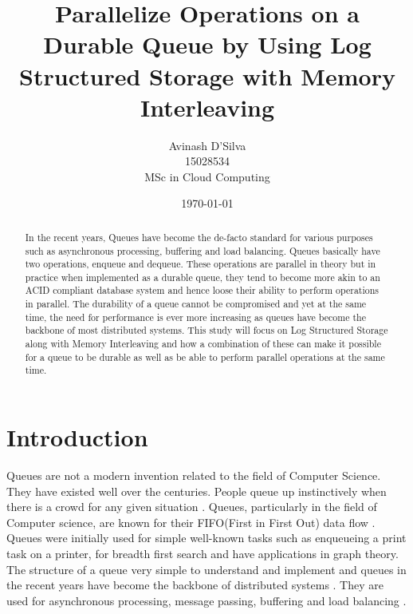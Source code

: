 \documentclass[12pt,a4paper]{article}
\begin{document}
\title{Parallelize Operations on a Durable Queue by Using Log Structured Storage with Memory Interleaving}%
\author{Avinash D'Silva \\ 15028534 \\ MSc in Cloud Computing}%
\date{\today}
\maketitle

\begin{abstract}
 In the recent years, Queues have become the de-facto standard for various purposes such as asynchronous processing, buffering and load balancing. Queues basically have two operations, enqueue and dequeue. These operations are parallel in theory but in practice when implemented as a durable queue, they tend to become more akin to an ACID compliant database system and hence loose their ability to perform operations in parallel. The durability of a queue cannot be compromised and yet at the same time, the need for performance is ever more increasing as queues have become the backbone of most distributed systems. This study will focus on Log Structured Storage along with Memory Interleaving and how a combination of these can make it possible for a queue to be durable as well as be able to perform parallel operations at the same time.
\end{abstract}

\tableofcontents

\section{Introduction}

Queues are not a modern invention related to the field of Computer Science. They have existed well over the centuries. People queue up instinctively when there is a crowd for any given situation \citep{spieser2008stabilizing}. Queues, particularly in the field of Computer science, are known for their FIFO(First in First Out) data flow \citep{maclaren1969art}. Queues were initially used for simple well-known tasks such as enqueueing a print task on a printer, for breadth first search and have applications in graph theory. \\

 The structure of a queue very simple to understand and implement and queues in the recent years have become the backbone of distributed systems \citep{lamport1978time}. They are used for asynchronous processing, message passing, buffering and load balancing \citep{lu2011join}. 
\end{document}
